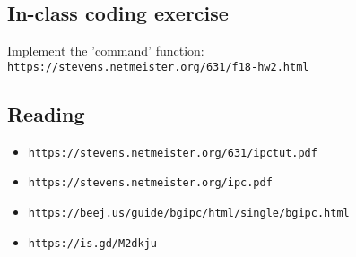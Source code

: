\documentclass[xga]{xdvislides}
\begin{document}
\subsection{In-class coding exercise}
Implement the 'command' function: \\

\vspace{1in}
\verb+https://stevens.netmeister.org/631/f18-hw2.html+

\subsection{Reading}
\begin{itemize}
	\item \verb+https://stevens.netmeister.org/631/ipctut.pdf+
	\item \verb+https://stevens.netmeister.org/ipc.pdf+
	\item \verb+https://beej.us/guide/bgipc/html/single/bgipc.html+
	\item \verb+https://is.gd/M2dkju+
\end{itemize}
\end{document}
